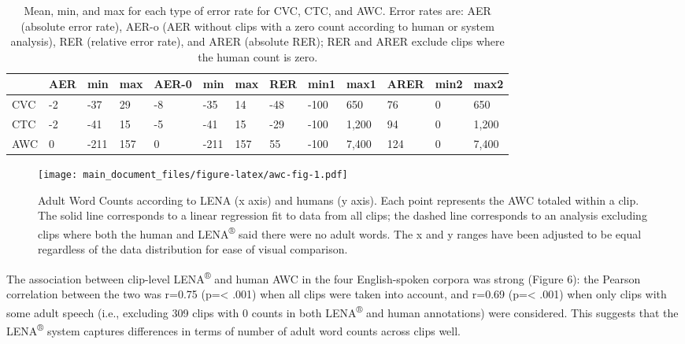 \documentclass[english,table,man,floatsintext]{apa6}
\begin{document}
\begin{table}[tbp]

\begin{center}
\begin{threeparttable}

\caption{\label{tab:tabrers}Mean, min, and max for each type of error rate for CVC, CTC, and AWC. Error rates are: AER (absolute error rate), AER-o (AER without clips with a zero count according to human or system analysis), RER (relative error rate), and ARER (absolute RER); RER and ARER exclude clips where the human count is zero.  }

\begin{tabular}{lllllllllllll}
\toprule
 & \multicolumn{1}{c}{AER} & \multicolumn{1}{c}{min} & \multicolumn{1}{c}{max} & \multicolumn{1}{c}{AER-0} & \multicolumn{1}{c}{min} & \multicolumn{1}{c}{max} & \multicolumn{1}{c}{RER} & \multicolumn{1}{c}{min1} & \multicolumn{1}{c}{max1} & \multicolumn{1}{c}{ARER} & \multicolumn{1}{c}{min2} & \multicolumn{1}{c}{max2}\\
\midrule
CVC & -2 & -37 & 29 & -8 & -35 & 14 & -48 & -100 & 650 & 76 & 0 & 650\\
CTC & -2 & -41 & 15 & -5 & -41 & 15 & -29 & -100 & 1,200 & 94 & 0 & 1,200\\
AWC & 0 & -211 & 157 & 0 & -211 & 157 & 55 & -100 & 7,400 & 124 & 0 & 7,400\\
\bottomrule
\end{tabular}

\end{threeparttable}
\end{center}

\end{table}

\begin{figure}
\centering
\texttt{[image: main\_document\_files/figure-latex/awc-fig-1.pdf]}
\caption{\label{fig:awc-fig}Adult Word Counts according to LENA (x axis) and humans (y axis). Each point represents the AWC totaled within a clip. The solid line corresponds to a linear regression fit to data from all clips; the dashed line corresponds to an analysis excluding clips where both the human and LENA\textsuperscript{®} said there were no adult words. The x and y ranges have been adjusted to be equal regardless of the data distribution for ease of visual comparison.}
\end{figure}

The association between clip-level LENA\textsuperscript{®} and human AWC in the four English-spoken corpora was strong (Figure 6): the Pearson correlation between the two was r=0.75 (p=\textless{} .001) when all clips were taken into account, and r=0.69 (p=\textless{} .001) when only clips with some adult speech (i.e., excluding 309 clips with 0 counts in both LENA\textsuperscript{®} and human annotations) were considered. This suggests that the LENA\textsuperscript{®} system captures differences in terms of number of adult word counts across clips well.
\end{document}
